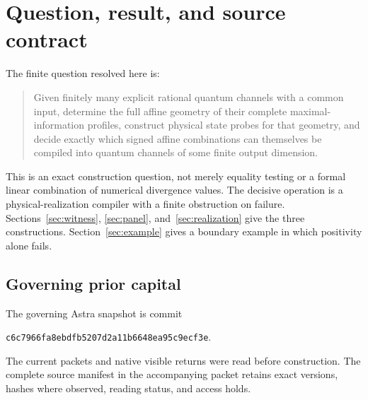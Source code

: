 \documentclass[11pt,a4paper]{article}
\theoremstyle{definition}\newtheorem{definition}[theorem]{Definition}
\begin{document}
\newpage
{\small\setlength{\parskip}{0pt}\tableofcontents}
\newpage

\section{Question, result, and source contract}

The finite question resolved here is:
\begin{quote}
Given finitely many explicit rational quantum channels with a common input, determine the full affine geometry of their complete maximal-information profiles, construct physical state probes for that geometry, and decide exactly which signed affine combinations can themselves be compiled into quantum channels of some finite output dimension.
\end{quote}
This is an exact construction question, not merely equality testing or a formal linear combination of numerical divergence values. The decisive operation is a physical-realization compiler with a finite obstruction on failure. Sections~\ref{sec:witness}, \ref{sec:panel}, and~\ref{sec:realization} give the three constructions. Section~\ref{sec:example} gives a boundary example in which positivity alone fails.

\subsection{Governing prior capital}

The governing Astra snapshot is commit
\begin{center}\small\texttt{c6c7966fa8ebdfb5207d2a11b6648ea95c9ecf3e}.\end{center}
The current packets and native visible returns were read before construction. The complete source manifest in the accompanying packet retains exact versions, hashes where observed, reading status, and access holds.
\end{document}
